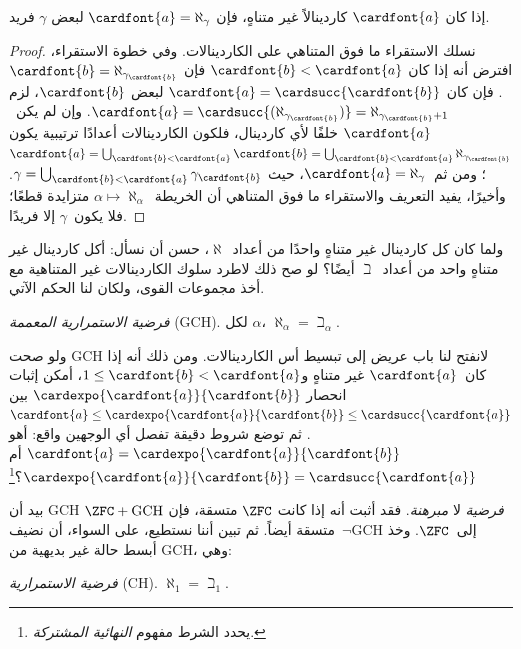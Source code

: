 \documentclass[../../../include/open-logic-section]{subfiles}
\begin{document}
\begin{prop}
إذا كان $\cardfont{a}$ كاردينالاً غير متناهٍ، فإن
$\cardfont{a} = \aleph_\gamma$ لبعض $\gamma$ فريد.
\end{prop}

\begin{proof}
نسلك الاستقراء ما فوق المتناهي على الكاردينالات. وفي خطوة الاستقراء،
افترض أنه إذا كان $\cardfont{b} < \cardfont{a}$ فإن
$\cardfont{b} = \aleph_{\gamma_\cardfont{b}}$. فإن كان
$\cardfont{a} = \cardsucc{\cardfont{b}}$ لبعض $\cardfont{b}$، لزم
$\cardfont{a} = \cardsucc{(\aleph_{\gamma_\cardfont{b}})}=
\aleph_{\gamma_\cardfont{b}+1}$. وإن لم يكن~$\cardfont{a}$ خلفًا لأي
كاردينال، فلكون الكاردينالات أعدادًا ترتيبية يكون
$\cardfont{a} = \bigcup_{\cardfont{b} < \cardfont{a}} \cardfont{b} =
\bigcup_{\cardfont{b} < \cardfont{a}}{\aleph_{\gamma_\cardfont{b}}}$؛
ومن ثم~$\cardfont{a} = \aleph_\gamma$، حيث
$\gamma = \bigcup_{\cardfont{b} < \cardfont{a}}
\gamma_\cardfont{b}$. وأخيرًا، يفيد التعريف والاستقراء ما فوق
المتناهي أن الخريطة~$\alpha\mapsto\aleph_\alpha$ متزايدة قطعًا؛ فلا
يكون~$\gamma$ إلا فريدًا.
\end{proof}

ولما كان كل كاردينال غير متناهٍ واحدًا من أعداد~$\aleph$، حسن أن
نسأل: أكل كاردينال غير متناهٍ واحد من أعداد~$\beth$ أيضًا؟ لو صح ذلك
لاطرد سلوك الكاردينالات غير المتناهية مع أخذ مجموعات القوى، ولكان لنا
الحكم الآتي.

\begin{defish}
\emph{فرضية الاستمرارية المعممة} (GCH). لكل $\alpha$،
$\aleph_\alpha = \beth_\alpha$.
\end{defish}

ولو صحت GCH لانفتح لنا باب عريض إلى تبسيط أس الكاردينالات. ومن ذلك أنه
إذا كان~$\cardfont{a}$ غير متناهٍ و$1 \leq \cardfont{b} < \cardfont{a}$،
أمكن إثبات انحصار
$\cardexpo{\cardfont{a}}{\cardfont{b}}$ بين
$\cardfont{a}\leq \cardexpo{\cardfont{a}}{\cardfont{b}} \leq
\cardsucc{\cardfont{a}}$. ثم توضع شروط دقيقة تفصل أي الوجهين واقع: أهو
$\cardfont{a} = \cardexpo{\cardfont{a}}{\cardfont{b}}$ أم
$\cardexpo{\cardfont{a}}{\cardfont{b}} =
\cardsucc{\cardfont{a}}$؟\footnote{يحدد الشرط مفهوم
\emph{النهائية المشتركة}.}

بيد أن GCH \emph{فرضية} لا \emph{مبرهنة}. فقد أثبت
\citet{Godel1938} أنه إذا كانت $\ZFC$ متسقة، فإن
$\ZFC + \text{GCH}$ متسقة أيضاً. ثم تبين أننا نستطيع، على السواء، أن
نضيف~$\lnot$GCH إلى~$\ZFC$. وخذ أبسط حالة غير بديهية من GCH، وهي:

\begin{defish}
\emph{فرضية الاستمرارية} (CH). $\aleph_1 = \beth_1$.
\end{defish}
\end{document}

